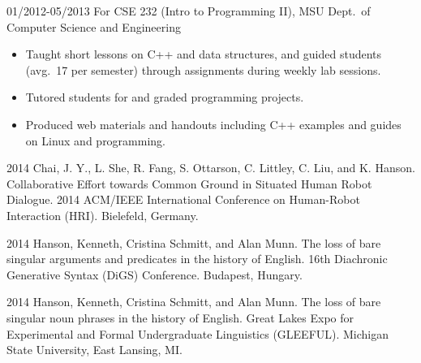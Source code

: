 \documentclass[10pt,oneside]{article}
\begin{document}
\begin{reslist}
		{01/2012-05/2013}
		{For CSE 232 (Intro to Programming II), MSU Dept.\ of Computer Science and Engineering}
		{}
	\begin{itemize}
		\item Taught short lessons on C++ and data structures, and guided students (avg.\ 17 per semester) through assignments during weekly lab sessions.
		\item Tutored students for and graded programming projects.
		\item Produced web materials and handouts including C++ examples and guides on Linux and programming.
	\end{itemize}
\end{reslist}



\begin{publist}
	\item[2014] {Chai, J. Y., L. She, R. Fang, S. Ottarson, C. Littley, C. Liu, and K. Hanson. Collaborative Effort towards Common Ground in Situated Human Robot Dialogue. 2014 ACM/IEEE International Conference on Human-Robot Interaction (HRI). Bielefeld, Germany.}
\end{publist}



\begin{publist}
	\item[2014] {Hanson, Kenneth, Cristina Schmitt, and Alan Munn. The loss of bare singular arguments and predicates in the history of English. 16th Diachronic Generative Syntax (DiGS) Conference. Budapest, Hungary.}
\end{publist}

\begin{publist}
	\item[2014] {Hanson, Kenneth, Cristina Schmitt, and Alan Munn. The loss of bare singular noun phrases in the history of English. Great Lakes Expo for Experimental and Formal Undergraduate Linguistics (GLEEFUL). Michigan State University, East Lansing, MI.}
\end{publist}
\end{document}
